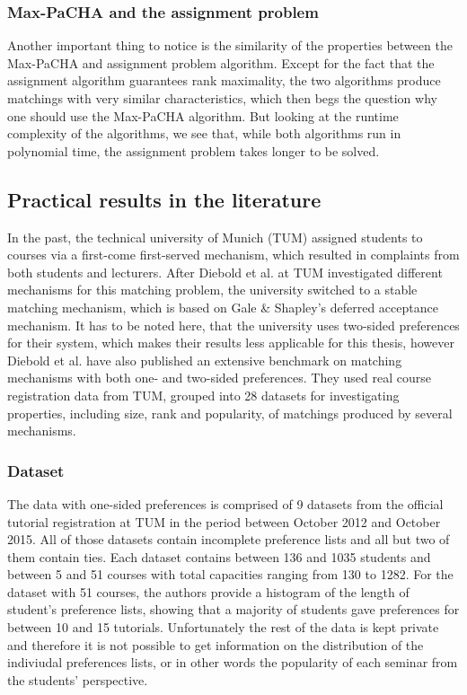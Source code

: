 \subsubsection{Max-PaCHA and the assignment problem}
Another important thing to notice is the similarity of the properties between the Max-PaCHA and assignment problem algorithm. Except for the fact that the assignment algorithm guarantees rank maximality, the two algorithms produce matchings with very similar characteristics, which then begs the question why one should use the Max-PaCHA algorithm. But looking at the runtime complexity of the algorithms, we see that, while both algorithms run in polynomial time, the assignment problem takes longer to be solved.

\subsection{Practical results in the literature}
In the past, the technical university of Munich (TUM) assigned students to courses via a first-come first-served mechanism, which resulted in complaints from both students and lecturers.\cite{tum-matching} After Diebold et al. \cite{Diebold2014} at TUM investigated different mechanisms for this matching problem, the university switched to a stable matching mechanism, which is based on Gale \& Shapley's deferred acceptance mechanism. It has to be noted here, that the university uses two-sided preferences for their system, which makes their results less applicable for this thesis, however Diebold et al. have also published an extensive benchmark on matching mechanisms with both one- and two-sided preferences.\cite{DieboldBenchmark} They used real course registration data from TUM, grouped into 28 datasets for investigating properties, including size, rank and popularity, of matchings produced by several mechanisms. 

\subsubsection{Dataset}
The data with one-sided preferences is comprised of 9 datasets from the official tutorial registration at TUM in the period between October 2012 and October 2015. All of those datasets contain incomplete preference lists and all but two of them contain ties. Each dataset contains between 136 and 1035 students and between 5 and 51 courses with total capacities ranging from 130 to 1282. For the dataset with 51 courses, the authors provide a histogram of the length of student's preference lists, showing that a majority of students gave preferences for between 10 and 15 tutorials.\cite{DieboldBenchmark} Unfortunately the rest of the data is kept private and therefore it is not possible to get information on the distribution of the indiviudal preferences lists, or in other words the popularity of each seminar from the students' perspective.

